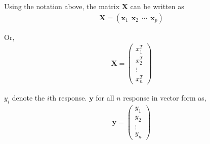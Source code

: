    \documentclass[12pt,a4paper]{article}%
\theoremstyle{definition}
\theoremstyle{plain}
\numberwithin{equation}{section}
\begin{document}
Using the notation above, the matrix $\mathbf{X}$ can be written as
\begin{gather}
\mathbf{X} =  (\mathbf{x}_{1} ~~ \mathbf{x}_{2} ~~  \cdots ~~  \mathbf{x}_{p})
\end{gather}

Or, 
\begin{gather}
\mathbf{X} =  \begin{pmatrix}
  x_{1}^{T} \\
  x_{2}^{T} \\
  \vdots \\
  x_{n}^{T}
 \end{pmatrix}
\end{gather}

$y_{i}$ denote the $i$th response. $\mathbf{y}$ for all $n$ response in vector form as,
\begin{gather}
\mathbf{y} =  \begin{pmatrix}
  y_{1} \\
  y_{2} \\
  \vdots \\
  y_{n}
 \end{pmatrix}
\end{gather}
\end{document}

